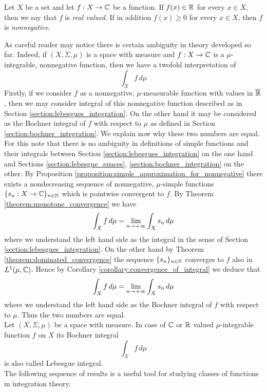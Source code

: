 \begin{definition}
    Let $X$ be a set and let $f:X\rightarrow {\mathbb C}$ be a function. If $f(x)\in {\mathbb R}$ for every $x\in X$, then we say that $f$ is \textit{real valued}. If in addition $f(x)\geq 0$ for every $x\in X$, then $f$ is \textit{nonnegative}.
\end{definition}
\noindent
As careful reader may notice there is certain ambiguity in theory developed so far. Indeed, if $(X,\Sigma,\mu)$ is a space with measure and $f:X\rightarrow {\mathbb C}$ is a $\mu$-integrable, nonnegative function, then we have a twofold interpretation of
$$\int_Xf\,d\mu$$
Firstly, if we consider $f$ as a nonnegative, $\mu$-measurable function with values in $\overline{{\mathbb R}}$, then we may consider integral of this nonnegative function described as in Section \ref{section:lebesgues_integration}. On the other hand it may be considered as the Bochner integral of $f$ with respect to $\mu$ as defined in Section \ref{section:bochner_integration}. We explain now why these two numbers are equal. For this note that there is no ambiguity in definitions of simple functions and their integrals between Section \ref{section:lebesgues_integration} on the one hand and Sections \ref{section:lebesgue_spaces}, \ref{section:bochner_integration} on the other. By Proposition \ref{proposition:simple_approximation_for_nonnegative} there exists a nondecreasing sequence of nonnegative, $\mu$-simple functions $\{s_n:X\rightarrow {\mathbb C}\}_{n\in {\mathbb N}}$ which is pointwise convergent to $f$. By Theorem \ref{theorem:monotone_convergence} we have
$$\int_Xf\,d\mu = \lim_{n\rightarrow +\infty}\int_Xs_n\,d\mu$$
where we understand the left hand side as the integral in the sense of Section \ref{section:lebesgues_integration}. On the other hand by Theorem \ref{theorem:dominated_convergence} the sequence $\{s_n\}_{n\in {\mathbb N}}$ converges to $f$ also in $L^1(\mu,{\mathbb C})$. Hence by Corollary \ref{corollary:convergence_of_integral} we deduce that
$$\int_Xf\,d\mu = \lim_{n\rightarrow +\infty}\int_Xs_n\,d\mu$$
where we understand the left hand side as the Bochner integral of $f$ with respect to $\mu$. Thus the two numbers are equal.\\
Let $(X,\Sigma, \mu)$ be a space with measure. In case of ${\mathbb C}$ or ${\mathbb R}$ valued $\mu$-integrable function $f$ on $X$ its Bochner integral
$$\int_X f\,d\mu$$
is also called Lebesgue integral.\\
The following sequence of results is a useful tool for studying classes of functions in integration theory.


